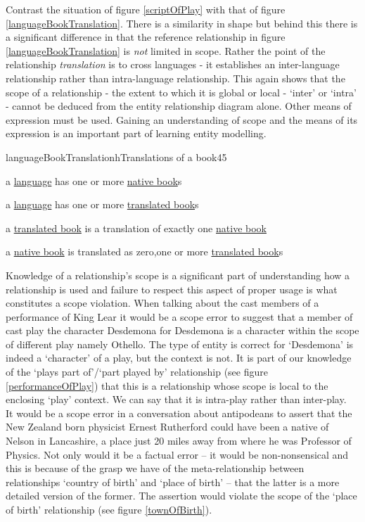 \documentclass[10pt,a4paper]{article}
\begin{document}
\noindent Contrast the situation of figure {\ref{scriptOfPlay}} with that of figure \ref{languageBookTranslation}. There is a similarity in shape  but behind this there is a significant difference in that the reference relationship in figure \ref{languageBookTranslation} is \emph{not} limited in scope. Rather the point of the relationship \emph{translation} is to cross languages - it establishes an inter-language relationship rather than intra-language relationship. This again shows that the scope of a relationship - the extent to which it is global or local - `inter' or `intra' - cannot be deduced from the entity relationship diagram alone. Other means of expression must be used. Gaining an understanding of scope and the means of its expression is an important part of learning entity modelling. \\

\begin{erbulletedDimFig}{languageBookTranslation}{h}{Translations of a book}{4}{5}
\item{a \underline{language} has one or more \underline{native book}s}
\item{a \underline{language} has one or more \underline{translated book}s}
\item{a \underline{translated book} is a translation of exactly one \underline{native book}}
\item{a \underline{native book} is translated as  zero,one or more \underline{translated book}s}
\end{erbulletedDimFig} 


\noindent Knowledge of a relationship's scope is a significant part of understanding how a relationship is used and failure 
to respect this aspect of proper usage is what constitutes a scope violation. When talking about the cast members of a performance of King Lear it would be a scope error to suggest that a 
member of cast play the character Desdemona for Desdemona is a character within the scope of different play namely Othello.  
The type of entity is correct for `Desdemona' is indeed a  `character' of a play, but the context is not. 
It is part of our knowledge of the `plays part of'/`part played by' relationship (see figure \ref{performanceOfPlay}) that this is a 
relationship whose scope is local to the enclosing `play' context. We can say that it is intra-play rather than inter-play. \\

\noindent It would be a scope error in a conversation about antipodeans to assert that the New Zealand born physicist Ernest Rutherford could have been 
a native of Nelson in Lancashire, a place just 20 miles away from where he was Professor of Physics. 
Not only would it be a factual error -- it would be non-nonsensical and 
this is because of the grasp we have of the meta-relationship
between relationships `country of birth' and `place of birth' -- that the latter is a more detailed version of the former. 
The assertion would violate the scope of the `place of birth' relationship (see figure \ref{townOfBirth}).\\
\end{document}
